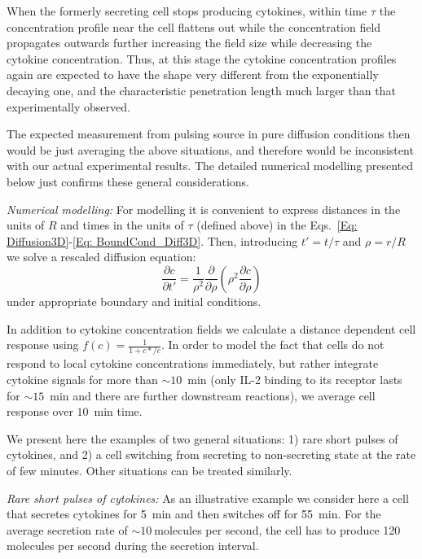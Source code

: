 \documentclass[11pt, oneside]{article}   	%
\begin{document}
When the formerly secreting cell stops producing cytokines, within time $\tau$ the concentration profile near the cell flattens out while the concentration field propagates outwards further increasing the field size while decreasing the cytokine concentration. Thus, at this stage the cytokine concentration profiles again are expected to have the shape very different from the exponentially decaying one, and the characteristic penetration length much larger than that experimentally observed.

The expected measurement from pulsing source in pure diffusion conditions then would be just averaging the above situations, and therefore would be inconsistent with our actual experimental results. The detailed numerical modelling presented below just confirms these general considerations.

\emph{Numerical modelling:} For modelling it is convenient to express distances in the units of $R$ and times in the units of $\tau$ (defined above) in the Eqs.~\ref{Eq: Diffusion3D}-\ref{Eq: BoundCond_Diff3D}. Then, introducing $t' = t/\tau$ and $\rho  = r/R$ we solve a rescaled diffusion equation:
\begin{equation}
\frac{\partial c}{ \partial t'} = \frac{1}{\rho^2}\frac{\partial}{\partial \rho} \left ( \rho^2 \frac{\partial c}{\partial \rho} \right )
\label{Eq: Diffusion3Drescaled}
\end{equation}
under appropriate boundary and initial conditions.

In addition to cytokine concentration fields we calculate a distance dependent cell response using $f(c) = \frac{1}{1+c*/c}$. In order to model the fact that cells do not respond to local cytokine concentrations immediately, but rather integrate cytokine signals for more than $\sim 10$~min (only IL-2 binding to its receptor lasts for $\sim 15$~min and there are further downstream reactions), we average cell response over $10$~min time.

We present here the examples of two general situations: 1) rare short pulses of cytokines, and 2) a cell switching from secreting to non-secreting state at the rate of few minutes. Other situations can be treated similarly.

\emph{Rare short pulses of cytokines:} 
As an illustrative example we consider here a cell that secretes cytokines for 5~min and then switches off for 55~min. For the average secretion rate of $\sim 10~$molecules per second, the cell has to produce 120 molecules per second during the secretion interval. 
\end{document}
